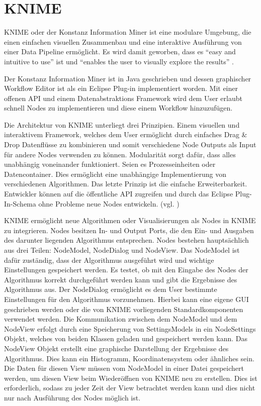 \section{KNIME}
\label{ch:Grundlagen:sec:knime}
KNIME oder der Konstanz Information Miner ist eine modulare Umgebung, die einen einfachen visuellen Zusammenbau und eine interaktive Ausführung von einer Data Pipeline ermöglicht. Es wird damit geworben, dass es \enquote{easy and intuitive to use} ist und \enquote{enables the user to visually explore the results} \cite[p. 2]{BCDG+07}. 

Der Konstanz Information Miner ist in Java geschrieben und dessen graphischer Workflow Editor ist als ein Eclipse Plug-in implementiert worden. Mit einer offenen API und einem Datenabstraktions Framework wird dem User erlaubt schnell Nodes zu implementieren und diese einem Workflow hinzuzufügen.

Die Architektur von KNIME unterliegt drei Prinzipien. Einem visuellen und interaktivem Framework, welches dem User ermöglicht durch einfaches Drag \& Drop Datenflüsse zu kombinieren und somit verschiedene Node Outputs als Input für andere Nodes verwenden zu können. Modularität sorgt dafür, dass alles unabhängig voneinander funktioniert. Seien es Prozesseinheiten oder Datencontainer. Dies ermöglicht eine unabhängige Implementierung von verschiedenen Algorithmen. Das letzte Prinzip ist die einfache Erweiterbarkeit. Entwickler können auf die öffentliche API zugreifen und durch das Eclipse Plug-In-Schema ohne Probleme neue Nodes entwickeln. (vgl. \cite{BCDG+07})

KNIME ermöglicht neue Algorithmen oder Visualisierungen als Nodes in KNIME zu integrieren. Nodes besitzen In- und Output Ports, die den Ein- und Ausgaben des darunter liegenden Algorithmus entsprechen. Nodes bestehen hauptsächlich aus drei Teilen: NodeModel, NodeDialog und NodeView. Das NodeModel ist dafür zuständig, dass der Algorithmus ausgeführt wird und wichtige Einstellungen gespeichert werden. Es testet, ob mit den Eingabe des Nodes der Algorithmus korrekt durchgeführt werden kann und gibt die Ergebnisse des Algorithmus aus. 
Der NodeDialog ermöglicht es dem User bestimmte Einstellungen für den Algorithmus vorzunehmen. Hierbei kann eine eigene GUI geschrieben werden oder die von KNIME vorliegenden Standardkomponenten verwendet werden. Die Kommunikation zwischen dem NodeModel und dem NodeView erfolgt durch eine Speicherung von SettingsModels in ein NodeSettings Objekt, welches von beiden Klassen geladen und gespeichert werden kann. 
Das NodeView Objekt erstellt eine graphische Darstellung der Ergebnisse des Algorithmus. Dies kann ein Histogramm, Koordinatensystem oder ähnliches sein. Die Daten für diesen View müssen vom NodeModel in einer Datei gespeichert werden, um diesen View beim Wiederöffnen von KNIME neu zu erstellen. Dies ist erforderlich, sodass zu jeder Zeit der View betrachtet werden kann und dies nicht nur nach Ausführung des Nodes möglich ist.

